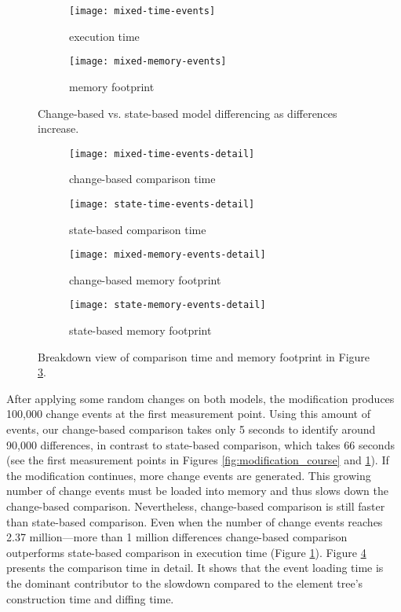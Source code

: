 \begin{figure}[ht]
  \begin{subfigure}[t]{0.495\linewidth}
    \texttt{[image: mixed-time-events]}
    \caption{execution time}
    \label{fig:time_diffs}
  \end{subfigure}
  \begin{subfigure}[t]{0.495\linewidth}
    \texttt{[image: mixed-memory-events]}
    \caption{memory footprint}
    \label{fig:memory_diffs}
  \end{subfigure}
  \caption{Change-based vs. state-based model differencing as differences increase.}
  \label{fig:change_vs_state}
\end{figure}

\begin{figure}[ht]
  \centering
  \begin{subfigure}[t]{0.495\linewidth}
    \texttt{[image: mixed-time-events-detail]}
    \caption{change-based comparison time}
    \label{fig:time_changediff_detail}
  \end{subfigure}
  \hfill
  \begin{subfigure}[t]{0.495\linewidth}
    \texttt{[image: state-time-events-detail]}
    \caption{state-based comparison time}
    \label{fig:time_statediff_detail}
  \end{subfigure}
  \begin{subfigure}[t]{0.495\linewidth}
    \texttt{[image: mixed-memory-events-detail]}
    \caption{change-based memory footprint}
    \label{fig:memory_changediff_detail}
  \end{subfigure}
  \hfill
  \begin{subfigure}[t]{0.495\linewidth}
    \texttt{[image: state-memory-events-detail]}
    \caption{state-based memory footprint}
    \label{fig:memory_statediff_detail}
  \end{subfigure}
  \caption{Breakdown view of comparison time and memory footprint in Figure \ref{fig:change_vs_state}.}
  \label{fig:time_memory_detail}
\end{figure}

After applying some random changes on both models, the modification produces 100,000 change events at the first measurement point. Using this amount of events, our change-based comparison takes only 5 seconds to identify around 90,000 differences, in contrast to state-based comparison, which takes 66 seconds (see the first measurement points in Figures \ref{fig:modification_course} and \ref{fig:time_diffs}). If the modification continues, more change events are generated. This growing number of change events must be loaded into memory and thus slows down the change-based comparison. Nevertheless, change-based comparison is still faster than state-based comparison. Even when the number of change events reaches 2.37 million—more than 1 million differences  change-based comparison outperforms state-based comparison in execution time (Figure \ref{fig:time_diffs}). Figure \ref{fig:time_changediff_detail} presents the comparison time in detail. It shows that the event loading time is the dominant contributor to the slowdown compared to the element tree’s construction time and diffing time.


